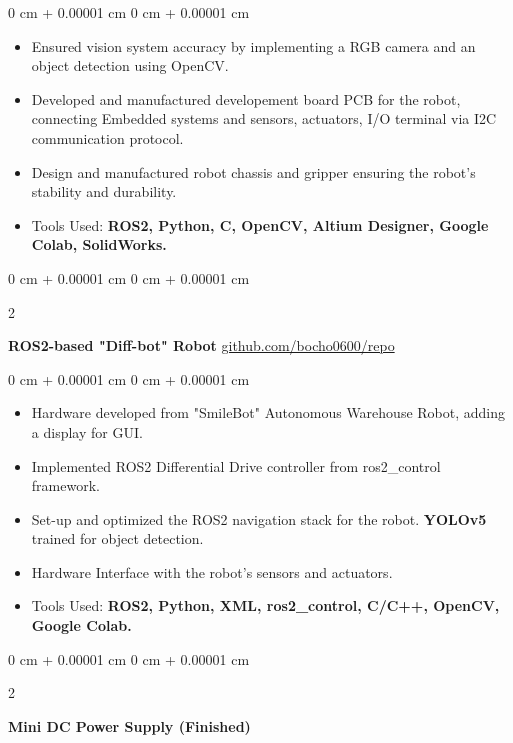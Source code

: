 \documentclass[10pt, letterpaper]{article}
\newenvironment{highlights}{
    \begin{itemize}[
        topsep=0.10 cm,
        parsep=0.10 cm,
        partopsep=0pt,
        itemsep=0pt,
        leftmargin=0 cm + 10pt
    ]
}{
    \end{itemize}
} %
\newenvironment{onecolentry}{
    \begin{adjustwidth}{
        0 cm + 0.00001 cm
    }{
        0 cm + 0.00001 cm
    }
}{
    \end{adjustwidth}
} %
\newenvironment{twocolentry}[2][]{
    \onecolentry
    \def\secondColumn{#2}
    \setcolumnwidth{\fill, 4.5 cm}
    \begin{paracol}{2}
}{
    \switchcolumn \raggedleft \secondColumn
    \end{paracol}
    \endonecolentry
} %
\begin{document}
\vspace{0.10 cm}
\begin{onecolentry}
      \begin{highlights}
            \item Ensured vision system accuracy by implementing a RGB camera and an object detection using OpenCV.
            \item Developed and manufactured developement board PCB for the robot, 
            connecting Embedded systems and sensors, actuators, I/O terminal via I2C communication protocol.
            \item Design and manufactured robot chassis and gripper ensuring the robot's stability and durability.
            \item Tools Used:\textbf{ ROS2, Python, C, OpenCV, Altium Designer, Google Colab, SolidWorks.}
      \end{highlights}
\end{onecolentry}

\vspace{0.4 cm}

\begin{twocolentry}{
            \href{https://github.com/bocho0600/EGB320-Group16}{github.com/bocho0600/repo}
      }
      \textbf{ROS2-based "Diff-bot" Robot}\end{twocolentry}

\vspace{0.10 cm}
\begin{onecolentry}
      \begin{highlights}
            \item Hardware developed from "SmileBot" Autonomous Warehouse Robot, adding a display for GUI.
            \item Implemented ROS2 Differential Drive controller from ros2\_control framework.
            \item Set-up and optimized the ROS2 navigation stack for the robot. \textbf{YOLOv5} trained for object detection.
            \item Hardware Interface with the robot's sensors and actuators.
            \item Tools Used: \textbf{ROS2, Python, XML, ros2\_control, C/C++, OpenCV, Google Colab.}
      \end{highlights}
\end{onecolentry}

\vspace{0.4 cm}
\begin{twocolentry}{
}
\textbf{Mini DC Power Supply (Finished)}\end{twocolentry}
\end{document}
